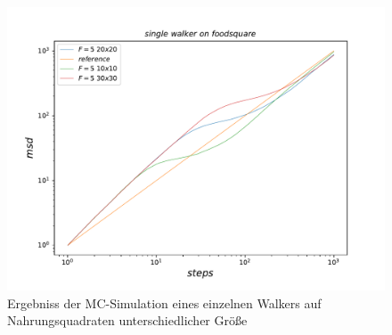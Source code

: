 \documentclass[a4paper, 12pt]{report}
\begin{document}
\begin{figure}[H]
	\centering
	\includegraphics[scale=0.8]{abc.pdf}
	\caption{Ergebniss der MC-Simulation eines einzelnen Walkers auf Nahrungsquadraten unterschiedlicher Größe}
\end{figure}

\clearpage
\end{document}
